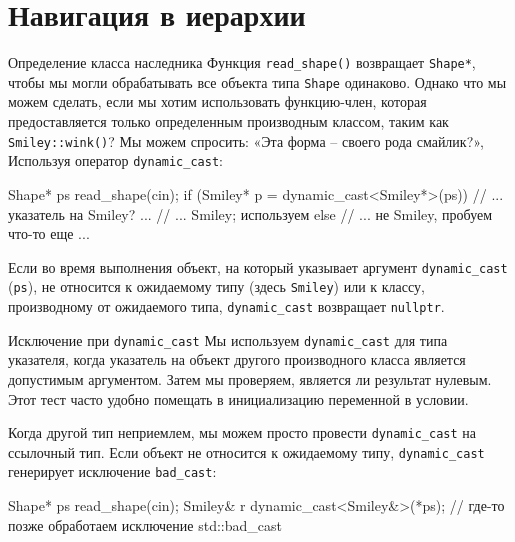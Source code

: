 \documentclass[
    8pt,
    hyperref={pdfencoding=unicode}
    ]{beamer}
\theoremstyle{definition}
\begin{document}
\section{Навигация в иерархии}
\begin{frame}[fragile]{Определение класса наследника}
    Функция \texttt{read_shape()} возвращает \texttt{Shape*}, чтобы мы могли обрабатывать все объекта типа \texttt{Shape} одинаково. Однако что мы можем сделать, если мы хотим использовать функцию-член, которая предоставляется только определенным производным классом, таким как \texttt{Smiley::wink()}? Мы можем спросить: «Эта форма -- своего рода смайлик?», Используя оператор \texttt{dynamic_cast}:
    \begin{cppcode}
        Shape* ps {read_shape(cin)};
        if (Smiley* p = dynamic_cast<Smiley*>(ps)) { // ... указатель на Smiley? ...
            // ... Smiley; используем 
        }
        else {
            // ... не Smiley, пробуем что-то еще ...
        }
    \end{cppcode}

    Если во время выполнения объект, на который указывает аргумент \texttt{dynamic_cast} (\texttt{ps}), 
    не относится к ожидаемому типу (здесь \texttt{Smiley}) или к классу, производному от ожидаемого типа, 
    \texttt{dynamic_cast} возвращает \texttt{nullptr}.
\end{frame}

\begin{frame}[fragile]{Исключение при \texttt{dynamic_cast}}
    Мы используем \texttt{dynamic_cast} для типа указателя, когда указатель на объект другого производного класса является допустимым аргументом. 
    Затем мы проверяем, является ли результат нулевым. Этот тест часто удобно помещать в инициализацию переменной в условии.
    \vspace{1em}
    
    Когда другой тип неприемлем, мы можем просто провести \texttt{dynamic_cast} на ссылочный тип. 
    Если объект не относится к ожидаемому типу, \texttt{dynamic_cast} генерирует исключение \texttt{bad_cast}:
    
    \begin{cppcode}
        Shape* ps {read_shape(cin)};
        Smiley& r {dynamic_cast<Smiley&>(*ps)}; // где-то позже обработаем исключение std::bad_cast
    \end{cppcode}

    
\end{frame}
\end{document}
